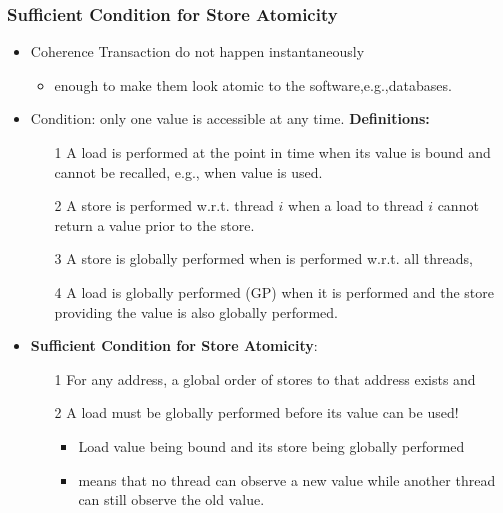 \documentclass{beamer}
\renewcommand{\emph}[1]{\textcolor{structure}{#1}}
\newcommand{\emp}[1]{\textcolor{DikuRed}{ #1}}
\begin{document}
\begin{frame}[fragile,t]
\frametitle{Sufficient Condition for Store Atomicity}

\begin{itemize}
    \item Coherence Transaction do not happen instantaneously
    \begin{itemize}
        \item enough to make them look atomic to the software,e.g.,databases.
    \end{itemize}\medskip

    \item Condition: only one value is accessible at any time. {\bf Definitions:}
    \begin{itemize}
        \item[1] \emp{A load is performed} at the point in time when 
                    its value is bound and cannot be recalled, e.g., when value is used.
        \item[2] \emp{A store is performed w.r.t. thread $i$} when a load 
                    to thread $i$ cannot return a value prior to the store.
        \item[3] \emp{A store is globally performed} when is performed 
                    w.r.t. all threads,
        \item[4] \emp{A load is globally performed (GP)} when it is performed and 
                    the store providing the value is also globally performed. 
    \end{itemize}\medskip
    \item \emph{{\bf Sufficient Condition for Store Atomicity}:}\pause
    \begin{itemize}
        \item[1] For any address, a global order of stores to that address exists \alert{and}
        \item[2] A load must be globally performed before its value can be used!\medskip
        \begin{itemize}
            \item Load value being bound and its store being globally performed 
            \item means that no thread can observe a new value while another thread
                    can still observe the old value.
        \end{itemize}

    \end{itemize}
\end{itemize}

\end{frame}
\end{document}
